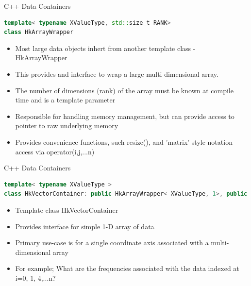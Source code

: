 \documentclass[xcolor=svgnames]{beamer}
\begin{document}
\begin{frame}[fragile]{C++ Data Containers}

\begin{lstlisting}[language=C++,basicstyle=\ttfamily\tiny,keywordstyle=\color{red}]
template< typename XValueType, std::size_t RANK> 
class HkArrayWrapper
\end{lstlisting}

\begin{itemize}
\item Most large data objects inhert from another template class - HkArrayWrapper
\item This provides and interface to wrap a large multi-dimensional array.
\item The number of dimensions (rank) of the array must be known at compile time and is a template parameter
\item Responsible for handling memory management, but can provide access to pointer to raw underlying memory
\item Provides convenience functions, such resize(), and 'matrix' style-notation access via operator(i,j,...n)
\end{itemize}

\end{frame}

\begin{frame}[fragile]{C++ Data Containers}

\begin{lstlisting}[language=C++,basicstyle=\ttfamily\tiny,keywordstyle=\color{red}]
template< typename XValueType >
class HkVectorContainer: public HkArrayWrapper< XValueType, 1>, public HkNamed
\end{lstlisting}

\begin{itemize}
\item Template class HkVectorContainer
\item Provides interface for simple 1-D array of data
\item Primary use-case is for a single coordinate axis associated with a multi-dimensional array
\item For example; What are the frequencies associated with the data indexed at i=0, 1, 4,...n?
\end{itemize}

\end{frame}
\end{document}
